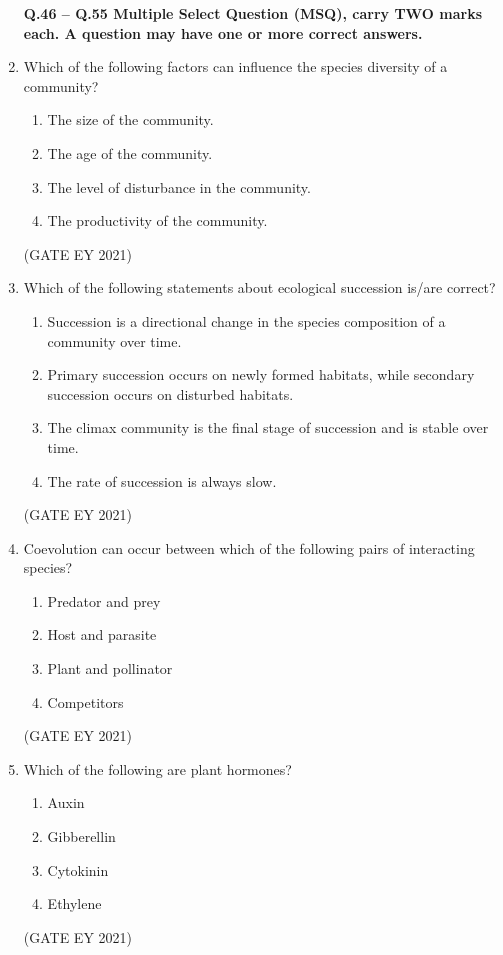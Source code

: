 \documentclass[journal]{IEEEtran}
\begin{document}
\begin{enumerate}
\textbf{Q.46 -- Q.55 Multiple Select Question (MSQ), carry TWO marks each. A question may have one or more correct answers.}

    \item Which of the following factors can influence the species diversity of a community?
    \begin{enumerate}
        \item The size of the community.
        \item The age of the community.
        \item The level of disturbance in the community.
        \item The productivity of the community.
    \end{enumerate}
    \hfill{(GATE EY 2021)}
    
    \item Which of the following statements about ecological succession is/are correct?
    \begin{enumerate}
        \item Succession is a directional change in the species composition of a community over time.
        \item Primary succession occurs on newly formed habitats, while secondary succession occurs on disturbed habitats.
        \item The climax community is the final stage of succession and is stable over time.
        \item The rate of succession is always slow.
    \end{enumerate}
    \hfill{(GATE EY 2021)}

    \item Coevolution can occur between which of the following pairs of interacting species?
    \begin{enumerate}
        \item Predator and prey
        \item Host and parasite
        \item Plant and pollinator
        \item Competitors
    \end{enumerate}
    \hfill{(GATE EY 2021)}
    
    \item Which of the following are plant hormones?
    \begin{multicols}{4}
    \begin{enumerate}
        \item Auxin
        \item Gibberellin
        \item Cytokinin
        \item Ethylene
    \end{enumerate}
    \end{multicols}
    \hfill{(GATE EY 2021)}
    

\end{enumerate}
\end{document}
